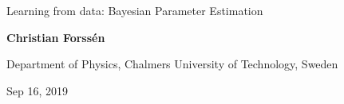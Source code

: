 \documentclass[%
oneside,                 %
final,                   %
10pt]{article}
\begin{document}

\newcommand{\exercisesection}[1]{\subsection*{#1}}







\thispagestyle{empty}

\begin{center}
{\LARGE\bf
\begin{spacing}{1.25}
Learning from data: Bayesian Parameter Estimation
\end{spacing}
}
\end{center}


\begin{center}
{\bf Christian Forssén}
\end{center}

    \begin{center}
\centerline{{\small Department of Physics, Chalmers University of Technology, Sweden}}
\end{center}
    

\begin{center}
Sep 16, 2019
\end{center}

\vspace{1cm}


\end{document}
